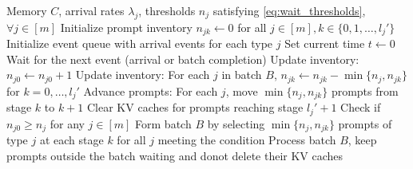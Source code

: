 \begin{algorithm}[h]
\caption{WAIT: Waiting for Accumulated Inference Threshold}
\label{alg:wait}
{\small\linespread{1.0}\selectfont
\begin{algorithmic}[1]
\Require Memory $C$, arrival rates $\lambda_j$, thresholds $n_j$ satisfying \eqref{eq:wait_thresholds}, $\forall j \in [m]$
\State Initialize prompt inventory $n_{jk} \gets 0$ for all $j \in [m], k \in \{0, 1, \dots, l_j'\}$ 
\State Initialize event queue with arrival events for each type $j$
\State Set current time $t \gets 0$  
    \State Wait for the next event (arrival or batch completion) 
        \State Update inventory: $n_{j0} \gets n_{j0} + 1$  
        \State Update inventory: For each $j$ in batch $B$, $n_{jk} \gets n_{jk} - \min\{n_j, n_{jk}\}$ for $k = 0, \dots, l_j'$  
        \State Advance prompts: For each $j$, move $\min\{n_j, n_{jk}\}$ prompts from stage $k$ to $k+1$  
        \State Clear KV caches for prompts reaching stage $l_j' + 1$  
    \EndIf
    \State Check if $n_{j0} \geq n_j$ for any $j \in [m]$  
        \State Form batch $B$ by selecting $\min\{n_j, n_{jk}\}$ prompts of type $j$ at each stage $k$ for all $j$ meeting the condition  
        \State Process batch $B$, keep prompts outside the batch waiting and donot delete their KV caches
    \EndIf
\EndWhile
\end{algorithmic}
}
\end{algorithm}
